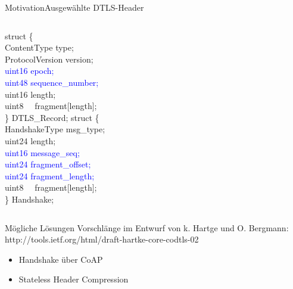 \documentclass{beamer}
\begin{document}
\begin{frame}{Motivation}{Ausgewählte DTLS-Header}
  \begin{columns}
      struct \{\\
      \qquad ContentType type;\\
      \qquad ProtocolVersion version;\\
      \qquad \textcolor{blue}{uint16 epoch;}\\
      \qquad \textcolor{blue}{uint48 sequence\_number;}\\
      \qquad uint16 length;\\
      \qquad uint8 ~~fragment[length];\\
      \} DTLS\_Record;
      struct \{\\
      \qquad HandshakeType msg\_type;\\
      \qquad uint24 length;\\
      \qquad \textcolor{blue}{uint16 message\_seq;}\\
      \qquad \textcolor{blue}{uint24 fragment\_offset;}\\
      \qquad \textcolor{blue}{uint24 fragment\_length;}\\
      \qquad uint8 ~~fragment[length];\\
      \} Handshake;
  \end{columns}
\end{frame}

\begin{frame}{Mögliche Lösungen}
  Vorschlänge im Entwurf von k. Hartge und O. Bergmann:\\
  http://tools.ietf.org/html/draft-hartke-core-codtls-02\\
  \begin{itemize}
    \item Handshake über CoAP
    \item Stateless Header Compression
  \end{itemize}
\end{frame}
\end{document}
